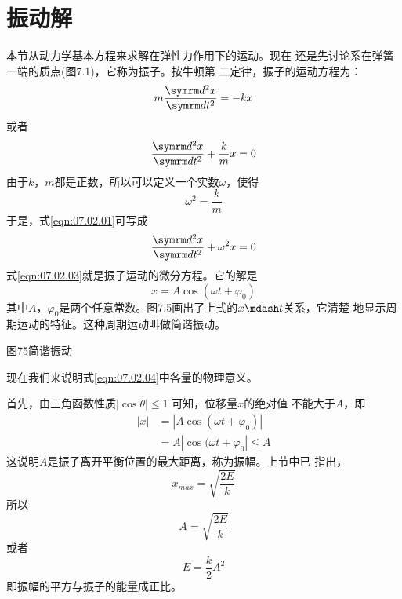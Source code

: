 \section{振动解}\label{sec:07.02}

本节从动力学基本方程来求解在弹性力作用下的运动。现在
还是先讨论系在弹簧一端的质点(图7.1)，它称为振子。按牛顿第
二定律，振子的运动方程为：
\begin{equation*}
	m \frac { \dif ^ { 2 } x } { \dif t ^ { 2 } } = - k x
\end{equation*}
或者
\begin{equation}\label{eqn:07.02.01}
	\frac { \dif ^ { 2 } x } { \dif t ^ { 2 } } + \frac { k } { m } x = 0
\end{equation}
由于$ k $，$ m $都是正数，所以可以定义一个实数$ \omega $，使得
\begin{equation}\label{eqn:07.02.02}
	\omega ^ { 2 } = \frac { k } { m }
\end{equation}
于是，式\eqref{eqn:07.02.01}可写成
\begin{equation}\label{eqn:07.02.03}
	\frac { \dif ^ { 2 } x } { \dif t ^ { 2 } } + \omega ^ { 2 } x = 0
\end{equation}
式\eqref{eqn:07.02.03}就是振子运动的微分方程。它的解是
\begin{equation}\label{eqn:07.02.04}
	x = A \cos ( \omega t + \varphi _ { 0 } )
\end{equation}
其中$ A $，$ \varphi _ { 0 } $是两个任意常数。图7.5画出了上式的$ x \mdash t $关系，它清楚
地显示周期运动的特征。这种周期运动叫做简谐振动。

图75简谐振动

现在我们来说明式\eqref{eqn:07.02.04}中各量的物理意义。

首先，由三角函数性质$  | \cos \theta | \leqslant 1  $ 可知，位移量$ x $的绝对值
不能大于$ A $，即
\begin{equation*}
	\begin{aligned}
	| x | &= | A \cos ( \omega t + \varphi _ { 0 } ) | \\
		  &= A | \cos ( \omega t + \varphi _ { 0 } | \leqslant A
	\end{aligned}
\end{equation*}
这说明$ A $是振子离开平衡位置的最大距离，称为振幅。上节中已
指出，
\begin{equation*}
	x _ { max } = \sqrt { \frac { 2 E } { k } }
\end{equation*}
所以
\begin{equation*}
	A = \sqrt { \frac { 2 E } { k } }
\end{equation*}
或者
\begin{equation}\label{eqn:07.02.05}
	E = \frac { k } { 2 } A ^ { 2 }
\end{equation}
即振幅的平方与振子的能量成正比。

